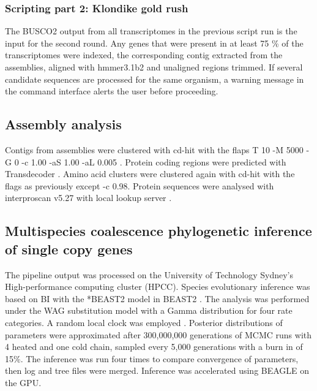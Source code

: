 \documentclass[12pt]{article}
\begin{document}
\subsubsection*{Scripting part 2: Klondike gold rush}
The BUSCO2 output from all transcriptomes in the previous script run is the input for the second round. 
Any genes that were present in at least 75 \% of the transcriptomes were indexed, the corresponding contig extracted from the assemblies, aligned with hmmer3.1b2 \cite{eddy2015hmmer} and unaligned regions trimmed.
If several candidate sequences are processed for the same organism, a warning message in the command interface alerts the user before proceeding.

\subsection*{Assembly analysis}
Contigs from assemblies were clustered with cd-hit with the flaps T 10 -M 5000 -G 0 -c 1.00 -aS 1.00 -aL 0.005 \cite{fu2012cd}. 
Protein coding regions were predicted with Transdecoder \cite{haas2016transdecoder}.
Amino acid clusters were clustered again with cd-hit with the flags as previously except -c 0.98.
Protein sequences were analysed with interproscan v5.27 with local lookup server \cite{quevillon2005interproscan}.

\subsection*{Multispecies coalescence phylogenetic inference of single copy genes}
The pipeline output was processed on the University of Technology Sydney's High-performance computing cluster (HPCC).
Species evolutionary inference was based on BI with the *BEAST2 model in BEAST2 \cite{bouckaert2014beast}. 
The analysis was performed under the WAG substitution model \cite{whelan2001general} with a Gamma distribution for four rate categories. 
A random local clock was employed \cite{drummond2010bayesian}. 
Posterior distributions of parameters were approximated after 300,000,000 generations of MCMC runs with 4 heated and one cold chain, sampled every 5,000 generations  with a burn in of 15\%. 
The inference was run four times to compare convergence of parameters, then log and tree files were merged. 
Inference was accelerated using BEAGLE \cite{ayres2011beagle} on the GPU.
\end{document}
